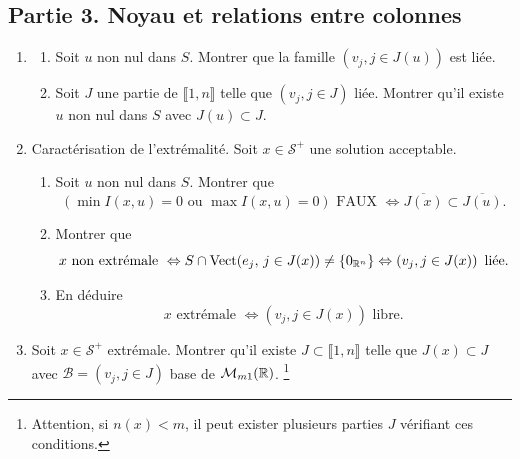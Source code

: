 \subsection*{Partie 3. Noyau et relations entre colonnes}
\begin{enumerate}
  \item
  \begin{enumerate}
    \item Soit $u$ non nul dans $S$. Montrer que la famille $\left( v_j, j\in J(u)\right)$ est liée.
    \item Soit $J$ une partie de $\llbracket 1,n \rrbracket$ telle que $\left( v_j, j\in J\right)$ liée. Montrer qu'il existe $u$ non nul dans $S$ avec $J(u) \subset J$.
  \end{enumerate}

  \item Caractérisation de l'extrémalité.  Soit $x \in \mathcal{S}^+$ une solution acceptable.
  \begin{enumerate}
    \item Soit $u$ non nul dans $S$. Montrer que 
\[
  \left(\min I(x,u) = 0\text{ ou } \max I(x,u)=0 \right) \text{ FAUX }
  \Leftrightarrow
  \overline{J(x)} \subset \overline{J(u)}.
\]
    \item Montrer que 
\[
  x \text{ non extrémale } \Leftrightarrow S \cap \operatorname{Vect}(e_j,\, j \in J(x)) \neq \left\lbrace 0_{\mathbb{R}^n} \right\rbrace
  \Leftrightarrow \left(v_j, j\in J(x)\right) \text{ liée}.
\]
    \item En déduire 
\[
  x \text{ extrémale } \Leftrightarrow \left(v_j, j\in J(x)\right) \text{ libre}.
\]
  \end{enumerate}
  \item Soit $x \in \mathcal{S}^+$ extrémale. 
  Montrer qu'il existe $J \subset \llbracket 1,n \rrbracket$ telle que $J(x) \subset J$ avec  
  $\mathcal{B} = \left( v_j, j\in J\right)$ base de $\mathcal{M}_{m 1}(\mathbb{R})$. \footnote{Attention, si $n(x) < m$, il peut exister plusieurs parties $J$ vérifiant ces conditions.}
\end{enumerate}
\clearpage

